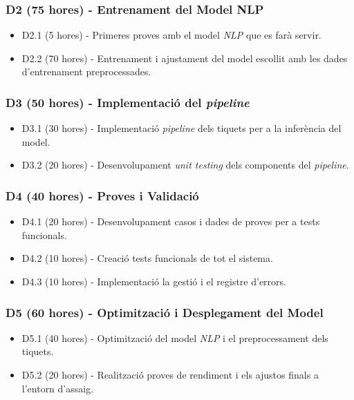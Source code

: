 \subsubsection{D2 (75 hores) - Entrenament del Model NLP}
\begin{itemize}
    \item D2.1 (5 hores) - Primeres proves amb el model \textit{NLP} que es farà servir.
    \item D2.2 (70 hores) - Entrenament i ajustament del model escollit amb les dades d'entrenament preprocessades.
\end{itemize}

\subsubsection{D3 (50 hores) - Implementació del \textit{pipeline}}
\begin{itemize}
    \item D3.1 (30 hores) - Implementació \textit{pipeline} dels tiquets per a la inferència del model.
    \item D3.2 (20 hores) - Desenvolupament \textit{unit testing} dels components del \textit{pipeline}.
\end{itemize}

\subsubsection{D4 (40 hores) - Proves i Validació}
\begin{itemize}
    \item D4.1 (20 hores) - Desenvolupament casos i dades de proves per a tests funcionals.
    \item D4.2 (10 hores) - Creació tests funcionals de tot el sistema.
    \item D4.3 (10 hores) - Implementació la gestió i el registre d'errors.
\end{itemize}

\subsubsection{D5 (60 hores) - Optimització i Desplegament del Model}
\begin{itemize}
    \item D5.1 (40 hores) - Optimització del model \textit{NLP} i el preprocessament dels tiquets.
    \item D5.2 (20 hores) - Realització proves de rendiment i els ajustos finals a l'entorn d'assaig.
\end{itemize}

